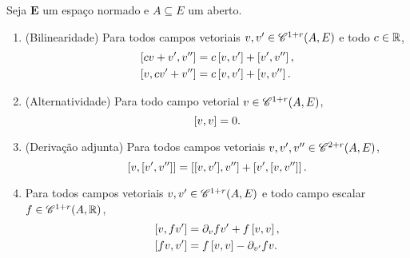\begin{proposition}
Seja $\bm E$ um espaço normado e $A \subseteq E$ um aberto.
	\begin{enumerate}
	\item (Bilinearidade) Para todos campos vetoriais $v,v' \in \mathscr{C}^{1+r}(A,E)$ e todo $c \in \mathbb{R}$,
		\begin{align*}
		\left[{cv+v'},{v''}\right] &= c\left[{v},{v'}\right] + \left[{v'},{v''}\right], \\
		\left[{v},{cv'+v''}\right] &= c\left[{v},{v'}\right] + \left[{v},{v''}\right].
		\end{align*}
		
	\item (Alternatividade) Para todo campo vetorial $v \in \mathscr{C}^{1+r}(A,E)$,
		\begin{equation*}
		\left[{v},{v}\right] = 0.
		\end{equation*}
	
	\item (Derivação adjunta) Para todos campos vetoriais $v,v', v'' \in \mathscr{C}^{2+r}(A,E)$,
		\begin{equation*}
		\left[{v},{\left[{v'},{v''}\right]}\right] = \left[{\left[{v},{v'}\right]},{v''}\right] + \left[{v'},{\left[{v},{v''}\right]}\right].
		\end{equation*}
	
	\item  Para todos campos vetoriais $v,v' \in \mathscr{C}^{1+r}(A,E)$ e todo campo escalar $f \in \mathscr{C}^{1+r}(A,\mathbb{R})$,
		\begin{align*}
		\left[{v},{fv'}\right] &= \partial_{v}f v' + f\left[{v},{v}\right], \\
		\left[{fv},{v'}\right] &= f\left[{v},{v}\right] - \partial_{v'}f v.
		\end{align*}
	\end{enumerate}
\end{proposition}
